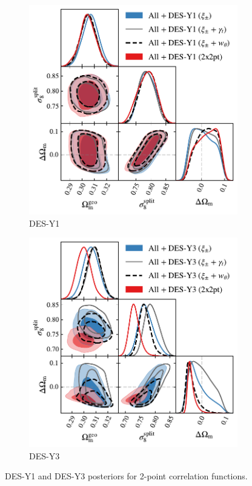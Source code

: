 \begin{figure}[ht]
	\centering
	\begin{subfigure}[b]{0.45\textwidth}
		\includegraphics[width=\textwidth]{plots/plot208_v3.pdf}
		\caption{DES-Y1}
		\label{fig:y1_2x2_lcdm}
	\end{subfigure}
	\begin{subfigure}[b]{0.45\textwidth}
		\includegraphics[width=\textwidth]{plots/plot208_v2.pdf}
		\caption{DES-Y3}
		\label{fig:y3_2x2_lcdm}
	\end{subfigure}
	\caption{DES-Y1 and DES-Y3 posteriors for 2-point correlation functions.}
	\label{fig:y3_2x2}
\end{figure}
